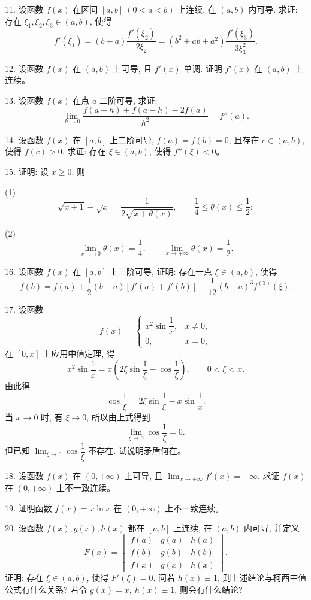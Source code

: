\documentclass[UTF8, 12pt, fontset=fandol, oneside]{ctexart}
\begin{document}
11. 设函数 $f(x)$ 在区间 $[a,b]\ (0<a<b)$ 上连续, 在 $(a,b)$ 内可导. 求证: 存在 $\xi_1,\xi_2,\xi_3\in(a,b)$, 使得
\[
  f'(\xi_1)=(b+a)\frac{f'(\xi_2)}{2\xi_2}
  =(b^2+ab+a^2)\frac{f'(\xi_3)}{3\xi_3^2}.
\]

12. 设函数 $f(x)$ 在 $(a,b)$ 上可导, 且 $f'(x)$ 单调. 证明 $f'(x)$ 在 $(a,b)$ 上连续。

13. 设函数 $f(x)$ 在点 $a$ 二阶可导, 求证:
\[
  \lim_{h\to0}\frac{f(a+h)+f(a-h)-2f(a)}{h^2}=f''(a).
\]

14. 设函数 $f(x)$ 在 $[a,b]$ 上二阶可导, $f(a)=f(b)=0$, 且存在 $c\in(a,b)$, 使得 $f(c)>0$. 求证: 存在 $\xi\in(a,b)$, 使得 $f''(\xi)<0$。

15. 证明: 设 $x\geqslant0$, 则

(1)
\[
  \sqrt{x+1}-\sqrt x=\frac1{2\sqrt{x+\theta(x)}},\qquad
  \frac14\leqslant\theta(x)\leqslant\frac12;
\]

(2)
\[
  \lim_{x\to+0}\theta(x)=\frac14,\qquad
  \lim_{x\to+\infty}\theta(x)=\frac12.
\]

16. 设函数 $f(x)$ 在 $[a,b]$ 上三阶可导, 证明: 存在一点 $\xi\in(a,b)$, 使得
\[
  f(b)=f(a)+\frac12(b-a)[f'(a)+f'(b)]-\frac1{12}(b-a)^3f^{(3)}(\xi).
\]

17. 设函数
\[
  f(x)=
  \begin{cases}
    x^2\sin\dfrac1x, & x\ne0,\\[4pt]
    0, & x=0,
  \end{cases}
\]
在 $[0,x]$ 上应用中值定理, 得
\[
  x^2\sin\frac1x=x\left(2\xi\sin\frac1\xi-\cos\frac1\xi\right),\qquad 0<\xi<x.
\]
由此得
\[
  \cos\frac1\xi=2\xi\sin\frac1\xi-x\sin\frac1x.
\]
当 $x\to0$ 时, 有 $\xi\to0$, 所以由上式得到
\[
  \lim_{\xi\to0}\cos\frac1\xi=0.
\]
但已知 $\lim_{\xi\to0}\cos\dfrac1\xi$ 不存在. 试说明矛盾何在。

18. 设函数 $f(x)$ 在 $(0,+\infty)$ 上可导, 且 $\lim_{x\to+\infty}f'(x)=+\infty$. 求证 $f(x)$ 在 $(0,+\infty)$ 上不一致连续。

19. 证明函数 $f(x)=x\ln x$ 在 $(0,+\infty)$ 上不一致连续。

20. 设函数 $f(x),g(x),h(x)$ 都在 $[a,b]$ 上连续, 在 $(a,b)$ 内可导, 并定义
\[
  F(x)=
  \begin{vmatrix}
    f(a) & g(a) & h(a)\\
    f(b) & g(b) & h(b)\\
    f(x) & g(x) & h(x)
  \end{vmatrix}.
\]
证明: 存在 $\xi\in(a,b)$, 使得 $F'(\xi)=0$. 问若 $h(x)\equiv1$, 则上述结论与柯西中值公式有什么关系? 若令 $g(x)=x,\ h(x)\equiv1$, 则会有什么结论?
\end{document}
